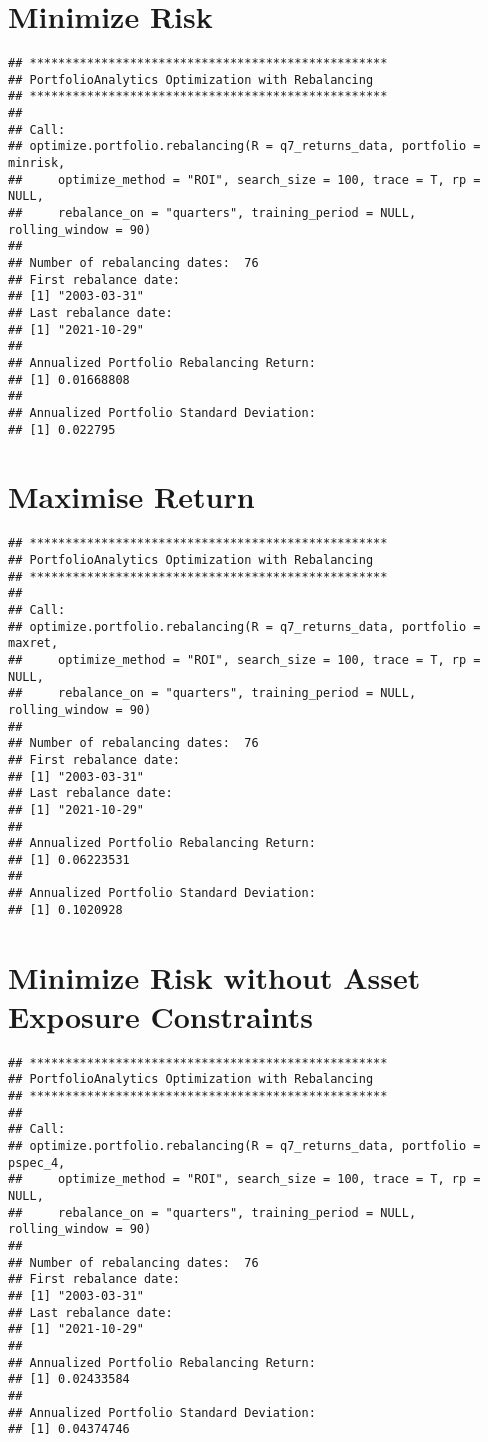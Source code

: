 \documentclass[
]{article}
\begin{document}
\hypertarget{minimize-risk}{%
\section{Minimize Risk}\label{minimize-risk}}

\begin{verbatim}
## **************************************************
## PortfolioAnalytics Optimization with Rebalancing
## **************************************************
## 
## Call:
## optimize.portfolio.rebalancing(R = q7_returns_data, portfolio = minrisk, 
##     optimize_method = "ROI", search_size = 100, trace = T, rp = NULL, 
##     rebalance_on = "quarters", training_period = NULL, rolling_window = 90)
## 
## Number of rebalancing dates:  76 
## First rebalance date:
## [1] "2003-03-31"
## Last rebalance date:
## [1] "2021-10-29"
## 
## Annualized Portfolio Rebalancing Return:
## [1] 0.01668808
## 
## Annualized Portfolio Standard Deviation:
## [1] 0.022795
\end{verbatim}

\hypertarget{maximise-return}{%
\section{Maximise Return}\label{maximise-return}}

\begin{verbatim}
## **************************************************
## PortfolioAnalytics Optimization with Rebalancing
## **************************************************
## 
## Call:
## optimize.portfolio.rebalancing(R = q7_returns_data, portfolio = maxret, 
##     optimize_method = "ROI", search_size = 100, trace = T, rp = NULL, 
##     rebalance_on = "quarters", training_period = NULL, rolling_window = 90)
## 
## Number of rebalancing dates:  76 
## First rebalance date:
## [1] "2003-03-31"
## Last rebalance date:
## [1] "2021-10-29"
## 
## Annualized Portfolio Rebalancing Return:
## [1] 0.06223531
## 
## Annualized Portfolio Standard Deviation:
## [1] 0.1020928
\end{verbatim}

\hypertarget{minimize-risk-without-asset-exposure-constraints}{%
\section{Minimize Risk without Asset Exposure
Constraints}\label{minimize-risk-without-asset-exposure-constraints}}

\begin{verbatim}
## **************************************************
## PortfolioAnalytics Optimization with Rebalancing
## **************************************************
## 
## Call:
## optimize.portfolio.rebalancing(R = q7_returns_data, portfolio = pspec_4, 
##     optimize_method = "ROI", search_size = 100, trace = T, rp = NULL, 
##     rebalance_on = "quarters", training_period = NULL, rolling_window = 90)
## 
## Number of rebalancing dates:  76 
## First rebalance date:
## [1] "2003-03-31"
## Last rebalance date:
## [1] "2021-10-29"
## 
## Annualized Portfolio Rebalancing Return:
## [1] 0.02433584
## 
## Annualized Portfolio Standard Deviation:
## [1] 0.04374746
\end{verbatim}
\end{document}
